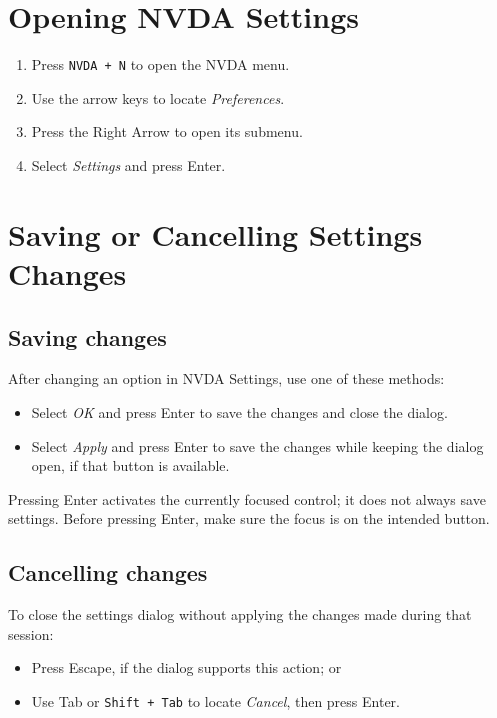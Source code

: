 \documentclass[11pt,oneside]{book}
\begin{document}
\chapter{Opening NVDA Settings}
\begin{enumerate}
	\item Press \texttt{NVDA + N} to open the NVDA menu.
	\item Use the arrow keys to locate \textit{Preferences}.
	\item Press the Right Arrow to open its submenu.
	\item Select \textit{Settings} and press Enter.
\end{enumerate}

\chapter{Saving or Cancelling Settings Changes}
\section{Saving changes}
After changing an option in NVDA Settings, use one of these methods:
\begin{itemize}
	\item Select \textit{OK} and press Enter to save the changes and close the dialog.
	\item Select \textit{Apply} and press Enter to save the changes while keeping the dialog open, if that button is available.
\end{itemize}
Pressing Enter activates the currently focused control; it does not always save settings. Before pressing Enter, make sure the focus is on the intended button.

\section{Cancelling changes}
To close the settings dialog without applying the changes made during that session:
\begin{itemize}
	\item Press Escape, if the dialog supports this action; or
	\item Use Tab or \texttt{Shift + Tab} to locate \textit{Cancel}, then press Enter.
\end{itemize}
\end{document}
